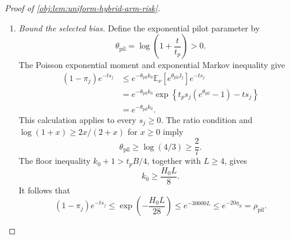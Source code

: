\documentclass[11pt]{article}
\begin{document}
\begin{proof}[Proof of \cref{obj:lem:uniform-hybrid-arm-risk}]
\begin{enumerate}
The inverse branch mean lies in \([0,p_j]\), by its explicit formula. Moreover,
\((\mathbb E_\nu[\mathcal P_j])^2\le
\mathbb E_\nu[\mathcal P_j^2]\). Hence
\[
\pi_j(1-\pi_j)\delta_j^2
\le
2\pi_j\mathbb E_\nu[\mathcal P_j^2]+2\pi_jp_j^2,
\]
and summing gives
\[
\sum_{j\in\mathcal J_{\mathrm{heavy}}}
\pi_j(1-\pi_j)\delta_j^2
\le
14\rho_{\mathrm{pil}}
\left(\frac1{u\epsilon}+1+\frac1t\right).
\]
Using the mixture variance identity and
\(\operatorname{Var}_\nu(\mathcal P_j)\le
\mathbb E_\nu[\mathcal P_j^2]\), we conclude
\[
\begin{aligned}
\sum_{j\in\mathcal J_{\mathrm{heavy}}}
\operatorname{Var}_\nu(\mathcal V_j)
\le{}&
\sum_{j\in\mathcal J_{\mathrm{heavy}}}
\operatorname{Var}_\nu(\mathcal H_j)\\
&+20\rho_{\mathrm{pil}}
\left(\frac1{u\epsilon}+1+\frac1t\right).
\end{aligned}
\]
Adding the light and heavy bounds proves
\[
\begin{aligned}
\sum_{j=1}^d\operatorname{Var}_\nu(\mathcal V_j)
\le{}&
\sum_{j=1}^d\operatorname{Var}_\nu(\mathcal H_j)\\
&+6F_{\mathrm{grow}}
\left(
\frac{M_{\mathrm{light}}}{u\epsilon}
+\frac{M_{\mathrm{light}}}{t}
+\frac{c_{\mathrm{light}}B^2}{\epsilon^2}
\right)\\
&+2c_{\mathrm{light}}
\left(\frac B{\epsilon L^2}\right)^2
+\frac1{e\,t\epsilon}\\
&+20\rho_{\mathrm{pil}}
\left(\frac1{u\epsilon}+1+\frac1t\right).
\end{aligned}
\]

\item \textit{Bound the selected bias.}
Define the exponential pilot parameter by
\[
\theta_{\mathrm{pil}}=\log\left(1+\frac t{t_p}\right)>0.
\]
The Poisson exponential moment and exponential Markov inequality give
\[
\begin{aligned}
(1-\pi_j)e^{-ts_j}
&\le
e^{-\theta_{\mathrm{pil}}k_0}
\mathbb E_\nu[e^{\theta_{\mathrm{pil}}\mathsf J_j}]
e^{-ts_j}\\
&=
e^{-\theta_{\mathrm{pil}}k_0}
\exp\left\{t_ps_j(e^{\theta_{\mathrm{pil}}}-1)-ts_j\right\}\\
&=e^{-\theta_{\mathrm{pil}}k_0}.
\end{aligned}
\]
This calculation applies to every \(s_j\ge0\). The ratio condition and
\(\log(1+x)\ge2x/(2+x)\) for \(x\ge0\) imply
\[
\theta_{\mathrm{pil}}\ge\log(4/3)\ge\frac27.
\]
The floor inequality \(k_0+1>t_pB/4\), together with \(L\ge4\), gives
\[
k_0\ge\frac{H_0L}{8}.
\]
It follows that
\[
(1-\pi_j)e^{-ts_j}
\le
\exp\left(-\frac{H_0L}{28}\right)
\le e^{-30000L}
\le e^{-20\eta_S}
=\rho_{\mathrm{pil}}.
\]


\end{enumerate}
\end{proof}
\end{document}

